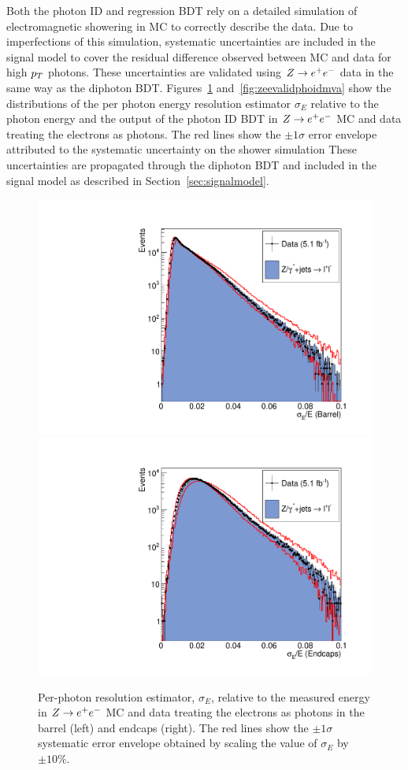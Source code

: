 Both the photon ID and regression BDT rely on a detailed simulation of electromagnetic showering  
in MC to correctly describe the data. Due to imperfections of this simulation, systematic
uncertainties are included in the signal model to cover the residual difference observed between MC and data
for high $p_{T}$ photons. 
These uncertainties are validated using $Z\rightarrow e^{+}e^{-}$ data in the same way as the diphoton BDT. 
Figures~\ref{fig:zeevalidsigmaE} and~\ref{fig:zeevalidphoidmva} show the distributions of the 
per photon energy resolution estimator $\sigma_{E}$ relative to the photon energy and the output of the 
photon ID BDT in $Z\rightarrow e^{+}e^{-}$ MC and data treating the electrons as photons. The red lines
show the $\pm 1\sigma$ error envelope attributed to the systematic uncertainty on the shower simulation 
These uncertainties are propagated through the diphoton BDT and included in the signal model as described in 
Section~\ref{sec:signalmodel}.

\begin{figure}
  \includegraphics[width=.48\textwidth]{hgg7TeV/zeeValidation/sigmaE_EB.pdf}
  \includegraphics[width=.48\textwidth]{hgg7TeV/zeeValidation/sigmaE_EE.pdf}
\caption{Per-photon resolution estimator, $\sigma_{E}$, relative to the measured energy in $Z\rightarrow e^{+}e^{-}$ 
MC and data 
treating the electrons as photons in the barrel (left) and endcaps (right). 
The red lines show the $\pm 1\sigma$ systematic error envelope obtained by scaling the value of 
$\sigma_{E}$ by $\pm 10\%$.}
\label{fig:zeevalidsigmaE}
\end{figure}

